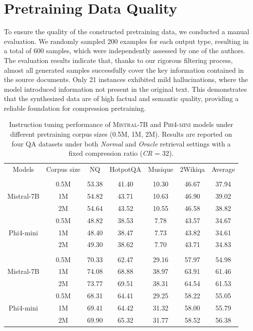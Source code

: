 \documentclass{applemlr}
\numberwithin{equation}{section}
\begin{document}
\section{Pretraining Data Quality}
\label{app:data-quality}
To ensure the quality of the constructed pretraining data, 
we conducted a manual evaluation. 
We randomly sampled 200 examples for each output type, 
resulting in a total of 600 samples, 
which were independently assessed by one of the authors. 
The evaluation results indicate that, 
thanks to our rigorous filtering process, 
almost all generated samples successfully cover the key information contained in the source documents. 
Only 21 instances exhibited mild hallucinations, 
where the model introduced information not present in the original text. 
This demonstrates that the synthesized data are of high factual and semantic quality, 
providing a reliable foundation for compression pretraining.
\begin{table}[H]
\scriptsize
\centering
\begin{tabular}{ccccccc}
\hline
Models & Corpus size & NQ & HotpotQA& Musique& 2Wikiqa & Average \\
\rowcolor{gray!15}
\multicolumn{7}{c}{\textbf{Normal}} \\
\multirow{3}{*}{Mistral-7B}  & 0.5M &53.38&41.40&10.30&46.67&37.94\\
  & 1M &54.82&43.71&10.63&46.90&39.02 \\
 & 2M &54.64&43.52&10.55&46.58 &38.82 \\

\hline 
\multirow{3}{*}{Phi4-mini} & 0.5M & 48.82&38.53&7.78&43.57 &34.67 \\
 & 1M & 48.40&38.47&7.73&43.82&34.61 \\
 & 2M & 49.30&38.62&7.70&43.71&34.83 \\

\hline
\rowcolor{gray!15}
\multicolumn{7}{c}{\textbf{Oracle}} \\
\multirow{3}{*}{Mistral-7B}  & 0.5M & 70.33&62.47&29.16& 57.97&54.98\\
& 1M & 74.08 &68.88&38.97&63.91 &61.46 \\
& 2M & 73.77 &69.51&38.31&64.54&61.53 \\

\hline 
\multirow{3}{*}{Phi4-mini} & 0.5M &68.31&64.41&29.25&58.22&55.05 \\
& 1M & 69.41&64.42&31.32&58.00&55.79 \\
 & 2M & 69.90&65.32&31.77&58.52&56.38 \\
\toprule
\end{tabular}
\caption{Instruction tuning performance of \textsc{Mistral-7B} and \textsc{Phi4-mini} models 
under different pretraining corpus sizes (0.5M, 1M, 2M). 
Results are reported on four QA datasets under both \textit{Normal} and \textit{Oracle} retrieval settings 
with a fixed compression ratio (\textit{CR} = 32).}
\label{data_scaling}
\end{table}
\end{document}
